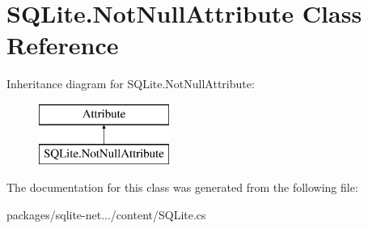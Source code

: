 \hypertarget{classSQLite_1_1NotNullAttribute}{}\section{S\+Q\+Lite.\+Not\+Null\+Attribute Class Reference}
\label{classSQLite_1_1NotNullAttribute}
Inheritance diagram for S\+Q\+Lite.\+Not\+Null\+Attribute\+:\begin{figure}[H]
\begin{center}
\leavevmode
\includegraphics[height=2.000000cm]{classSQLite_1_1NotNullAttribute}
\end{center}
\end{figure}


The documentation for this class was generated from the following file\+:\begin{DoxyCompactItemize}
\item 
packages/sqlite-\/net.../content/S\+Q\+Lite.\+cs\end{DoxyCompactItemize}
